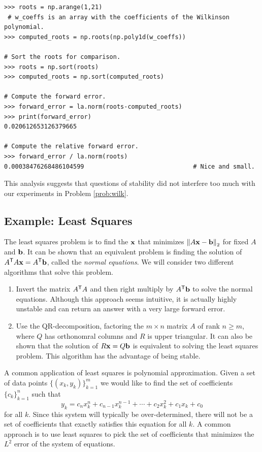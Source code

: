 \begin{lstlisting}
>>> roots = np.arange(1,21)
 # w_coeffs is an array with the coefficients of the Wilkinson polynomial.
>>> computed_roots = np.roots(np.poly1d(w_coeffs))

# Sort the roots for comparison.
>>> roots = np.sort(roots)
>>> computed_roots = np.sort(computed_roots)

# Compute the forward error.
>>> forward_error = la.norm(roots-computed_roots)
>>> print(forward_error)
0.020612653126379665

# Compute the relative forward error.
>>> forward_error / la.norm(roots)
0.00038476268486104599                              # Nice and small.
\end{lstlisting}

This analysis suggests that questions of stability did not interfere too much with our experiments in Problem \ref{prob:wilk}.

\subsection*{Example: Least Squares} %

The least squares problem is to find the $\mathbf{x}$ that minimizes $\left\lVert A\mathbf{x} -\mathbf{b}\right\rVert_2$ for fixed $A$ and $\mathbf{b}$.
It can be shown that an equivalent problem is finding the solution of $A^{\mathsf T} A\mathbf{x} =A^{\mathsf T} \mathbf{b}$, called the \emph{normal equations}.
We will consider two different algorithms that solve this problem.

\begin{enumerate}
\item Invert the matrix $A^{\mathsf T} A$ and then right multiply by $A^{\mathsf T} \mathbf{b}$ to solve the normal equations.
Although this approach seems intuitive, it is actually highly unstable and can return an answer with a very large forward error.

\item
Use the QR-decomposition, factoring the $m\times n$ matrix $A$ of rank $n\geq m$, where $Q$ has orthonomral columns and $R$ is upper triangular.
It can also be shown that the solution of $R \mathbf{x} = Q\mathbf{b}$ is equivalent to solving the least squares problem.
This algorithm has the advantage of being stable.
\end{enumerate}

A common application of least squares is polynomial approximation.
Given a set of data points $\{(x_k, y_k)\}_{k=1}^m$ we would like to find the set of coefficients $\{c_k\}_{k=1}^n$ such that
\[
y_k = c_n x_k^n + c_{n-1} x_k^{n-1} + \cdots + c_2 x_k^2 + c_1 x_k + c_0
\]
for all $k$.
Since this system will typically be over-determined, there will not be a set of coefficients that exactly satisfies this equation for all $k$.
A common approach is to use least squares to pick the set of coefficients that minimizes the $L^2$ error of the system of equations.

